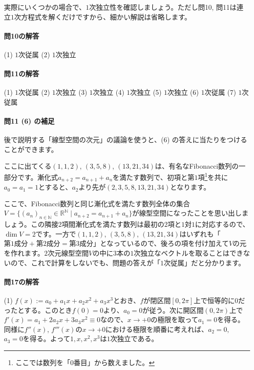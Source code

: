 実際にいくつかの場合で、$1$次独立性を確認しましょう。ただし問10, 問11は連立$1$次方程式を解くだけですから、細かい解説は省略します。

\paragraph{問10の解答} (1) $1$次従属 (2) $1$次独立

\paragraph{問11の解答} (1) $1$次従属 (2) $1$次独立 (3) $1$次独立 (4) $1$次独立 (5) $1$次独立 (6) $1$次従属 (7) $1$次従属

\paragraph{問11 (6) の補足} 後で説明する「線型空間の次元」の議論を使うと、(6) の答えに当たりをつけることができます。

ここに出てくる$(1, 1, 2)$, $(3, 5, 8)$, $(13, 21, 34)$は、有名なFibonacci数列の一部分です。漸化式$a_{n + 2} = a_{n + 1} + a_n$を満たす数列で、初項と第$1$項\footnote{ここでは数列を「$0$番目」から数えました。}を共に$a_0 = a_1 = 1$とすると、$a_2$より先が$(2, 3, 5, 8, 13, 21, 34)$となります。

ここで、Fibonacci数列と同じ漸化式を満たす数列全体の集合$V = \{(a_n)_{n \in \mathbb{N}} \in \mathbb{R}^{\mathbb{N}} \mid a_{n + 2} = a_{n + 1} + a_n\}$が線型空間になったことを思い出しましょう。この隣接$2$項間漸化式を満たす数列は最初の$2$項と$1$対$1$に対応するので、$\dim V = 2$です。一方で$(1, 1, 2)$, $(3, 5, 8)$, $(13, 21, 34)$はいずれも「$\text{第$1$成分} + \text{第$2$成分} = \text{第$3$成分}$」となっているので、後ろの項を付け加えて$V$の元を作れます。$2$次元線型空間$V$の中に$3$本の$1$次独立なベクトルを取ることはできないので、これで計算をしないでも、問題の答えが「$1$次従属」だと分かります。

\paragraph{問17の解答}
(1) $f(x) := a_0 + a_1 x + a_2 x^2 + a_3 x^3$とおき、$f$が閉区間$[0, 2\pi]$上で恒等的に$0$だったとする。このとき$f(0) = 0$より、$a_0 = 0$が従う。次に開区間$(0, 2\pi)$上で$f'(x) = a_1 + 2a_2 x + 3a_3 x^2 \equiv 0$なので、$x\rightarrow +0$の極限を取って$a_1 = 0$を得る。同様に$f''(x)$, $f'''(x)$の$x\rightarrow +0$における極限を順番に考えれば、$a_2 = 0$, $a_3 = 0$を得る。よって$1, x, x^2, x^3$は$1$次独立である。

